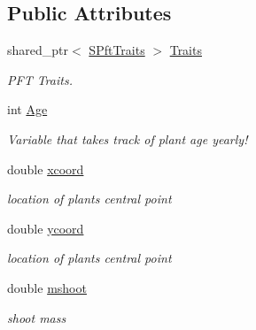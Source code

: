 \subsection*{Public Attributes}
\begin{DoxyCompactItemize}
\item 
\mbox{\label{class_c_plant_aab480753ce36094220b0c38fbc2b69eb}} 
shared\+\_\+ptr$<$ \mbox{\hyperlink{class_s_pft_traits}{S\+Pft\+Traits}} $>$ \mbox{\hyperlink{class_c_plant_aab480753ce36094220b0c38fbc2b69eb}{Traits}}
\begin{DoxyCompactList}\small\item\em P\+FT Traits. \end{DoxyCompactList}\item 
\mbox{\label{class_c_plant_ab62bab7acf579a6c916f5b48ce9a74ee}} 
int \mbox{\hyperlink{class_c_plant_ab62bab7acf579a6c916f5b48ce9a74ee}{Age}}
\begin{DoxyCompactList}\small\item\em Variable that takes track of plant age yearly! \end{DoxyCompactList}\item 
\mbox{\label{class_c_plant_ac2b543810530a9f6c17568b6b10b1f24}} 
double \mbox{\hyperlink{class_c_plant_ac2b543810530a9f6c17568b6b10b1f24}{xcoord}}
\begin{DoxyCompactList}\small\item\em location of plant\textquotesingle{}s central point \end{DoxyCompactList}\item 
\mbox{\label{class_c_plant_a9fe81fee2c6f6493abe9d4e425f53a47}} 
double \mbox{\hyperlink{class_c_plant_a9fe81fee2c6f6493abe9d4e425f53a47}{ycoord}}
\begin{DoxyCompactList}\small\item\em location of plant\textquotesingle{}s central point \end{DoxyCompactList}\item 
\mbox{\label{class_c_plant_a3e5389c084caf629364f78d9b2209f34}} 
double \mbox{\hyperlink{class_c_plant_a3e5389c084caf629364f78d9b2209f34}{mshoot}}
\begin{DoxyCompactList}\small\item\em shoot mass \end{DoxyCompactList}\item 

\end{DoxyCompactItemize}
